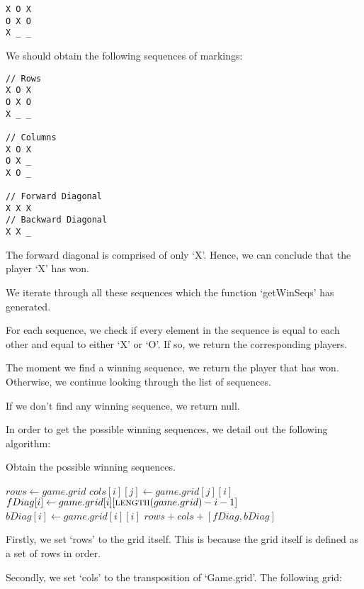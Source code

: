 \documentclass{article}
\begin{document}
\begin{verbatim}
X O X
O X O
X _ _
\end{verbatim}

We should obtain the following sequences of markings:

\begin{verbatim}
// Rows
X O X
O X O
X _ _

// Columns
X O X
O X _
X O _

// Forward Diagonal
X X X
// Backward Diagonal
X X _
\end{verbatim}

The forward diagonal is comprised of only `X'. Hence, we can conclude that the player `X' has won.

We iterate through all these sequences which the function `getWinSeqs' has generated.

For each sequence, we check if every element in the sequence is equal to each other and equal to either `X' or `O'. If so, we return the corresponding players.

The moment we find a winning sequence, we return the player that has won. Otherwise, we continue looking through the list of sequences.

If we don't find any winning sequence, we return null.

In order to get the possible winning sequences, we detail out the following algorithm:

\begin{algorithm}
\caption{Obtain the possible winning sequences.}

\begin{algorithmic}[1]
\State $rows \gets game.grid$
    \State $cols[i][j] \gets game.grid[j][i]$
  \EndFor
\EndFor
{}
  \State $fDiag[i] \gets game.grid[i][\Call{length}{game.grid} - i - 1]$
\EndFor
{}
  \State $bDiag[i] \gets game.grid[i][i]$
\EndFor
\Return $rows + cols + [fDiag, bDiag]$
\EndProcedure
\end{algorithmic}
\end{algorithm}

Firstly, we set `rows' to the grid itself. This is because the grid itself is defined as a set of rows in order.

Secondly, we set `cols' to the transposition of `Game.grid'. The following grid:
\end{document}
